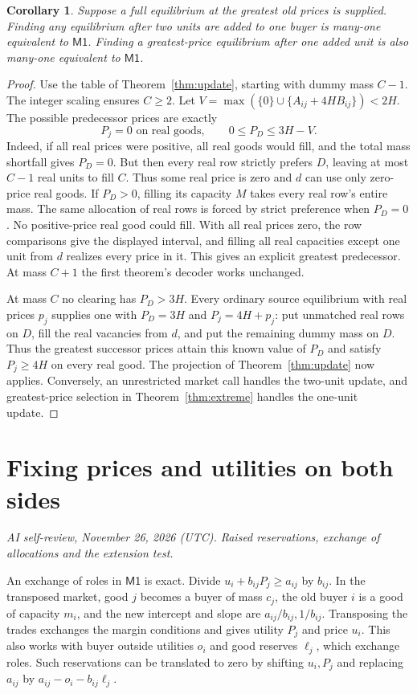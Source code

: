 \documentclass[11pt,oneside,openany,notitlepage]{report}
\newtheorem{corollary}[theorem]{Corollary}
\newcommand{\Market}{\mathsf{M1}}
\newcommand{\reviewdate}{November 26, 2026 (UTC)}
\newcommand{\reviewmark}[1]{\par\nopagebreak[4]\noindent
  {\footnotesize\itshape AI self-review, \reviewdate. #1\par}\nobreak\smallskip}
\begin{document}
\begin{corollary}\label{cor:update-greatest}
Suppose a full equilibrium at the greatest old prices is supplied.
Finding any equilibrium after two units are added to one buyer is
many-one equivalent to \(\Market\). Finding a greatest-price equilibrium
after one added unit is also many-one equivalent to \(\Market\).
\end{corollary}
\begin{proof}
Use the table of Theorem~\ref{thm:update}, starting with dummy mass
\(C-1\). The integer scaling ensures \(C\ge2\). Let
\(V=\max(\{0\}\cup\{A_{ij}+4HB_{ij}\})<2H\).
The possible predecessor prices are exactly
\[
 P_j=0\text{ on real goods},\qquad 0\le P_D\le3H-V .
\]
Indeed, if all real prices were positive, all real goods would fill,
and the total mass shortfall gives \(P_D=0\). But then every real row
strictly prefers \(D\), leaving at most \(C-1\) real units to fill \(C\).
Thus some real price is zero and \(d\) can use only zero-price real
goods. If \(P_D>0\), filling its capacity \(M\) takes every real row's
entire mass. The same allocation of real rows is forced by strict
preference when \(P_D=0\). No positive-price real good could fill.
With all real prices zero, the row comparisons give the displayed
interval, and filling all real capacities except one unit from \(d\)
realizes every price in it. This gives an explicit greatest predecessor.
At mass \(C+1\) the first theorem's decoder works unchanged.

At mass \(C\) no clearing has \(P_D>3H\). Every ordinary source
equilibrium with real prices \(p_j\) supplies one with \(P_D=3H\)
and \(P_j=4H+p_j\): put unmatched real rows on \(D\), fill the real
vacancies from \(d\), and put the remaining dummy mass on \(D\).
Thus the greatest successor prices attain this known value of \(P_D\)
and satisfy \(P_j\ge4H\) on every real good. The projection of
Theorem~\ref{thm:update} now applies. Conversely, an unrestricted
market call handles the two-unit update, and greatest-price selection
in Theorem~\ref{thm:extreme} handles the one-unit update.
\end{proof}

\chapter{Fixing prices and utilities on both sides}\label{sec:pins}
\reviewmark{Raised reservations, exchange of allocations and the extension test.}

An exchange of roles in \(\Market\) is exact. Divide
\(u_i+b_{ij}P_j\ge a_{ij}\) by \(b_{ij}\). In the transposed market,
good \(j\) becomes a buyer of mass \(c_j\), the old buyer \(i\) is a good
of capacity \(m_i\), and the new intercept and slope are
\(a_{ij}/b_{ij},1/b_{ij}\). Transposing the trades exchanges the margin
conditions and gives utility \(P_j\) and price \(u_i\). This also works
with buyer outside utilities \(o_i\) and good reserves \(\ell_j\), which
exchange roles. Such reservations can be translated to zero by shifting
\(u_i,P_j\) and replacing \(a_{ij}\) by \(a_{ij}-o_i-b_{ij}\ell_j\).
\end{document}
